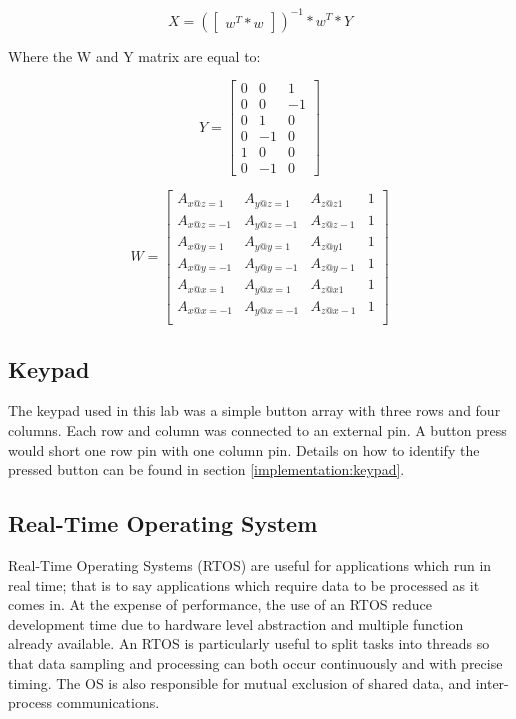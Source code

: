 \documentclass[12pt]{article}
\begin{document}
\begin{equation} \label{cal_eq:2}
 X = (\begin{bmatrix} w^{T}*w \end{bmatrix})^{-1}*w^{T} * Y
 \end{equation}

Where the W and Y matrix are equal to:

\begin{equation} \label{cal_eq:3}
 Y = \begin{bmatrix} 0 & 0 & 1  \\
            0 & 0 & -1 \\
                      0 & 1 & 0  \\
                      0 & -1 & 0 \\
                      1 & 0 & 0  \\
                      0 & -1 & 0
                      \end{bmatrix}
\end{equation}

\begin{equation} \label{cal_eq:4}
 W = \begin{bmatrix} A_{x@z=1} & A_{y@z=1} & A_{z@z1} & 1 \\
            A_{x@z=-1} & A_{y@z=-1} & A_{z@z-1} & 1 \\
                      A_{x@y=1} & A_{y@y=1} & A_{z@y1} & 1 \\
                      A_{x@y=-1} & A_{y@y=-1} & A_{z@y-1} & 1 \\
                      A_{x@x=1} & A_{y@x=1} & A_{z@x1} & 1 \\
                      A_{x@x=-1} & A_{y@x=-1} & A_{z@x-1} & 1 \\
                      \end{bmatrix}
\end{equation}
\subsection{Keypad}
The keypad used in this lab was a simple button array with three rows and four columns. Each row and column was connected to an external pin. A button press would short one row pin with one column pin. Details on how to identify the pressed button can be found in section \ref{implementation:keypad}.


\subsection{Real-Time Operating System}
Real-Time Operating Systems (RTOS) are useful for applications which run in real time; that is to say applications which require data to be processed as it comes in. At the expense of performance, the use of an RTOS reduce development time due to hardware level abstraction and multiple function already available. An RTOS is particularly useful to split tasks into threads so that data sampling and processing can both occur continuously and with precise timing. The OS is also responsible for mutual exclusion of shared data, and inter-process communications.
\end{document}
